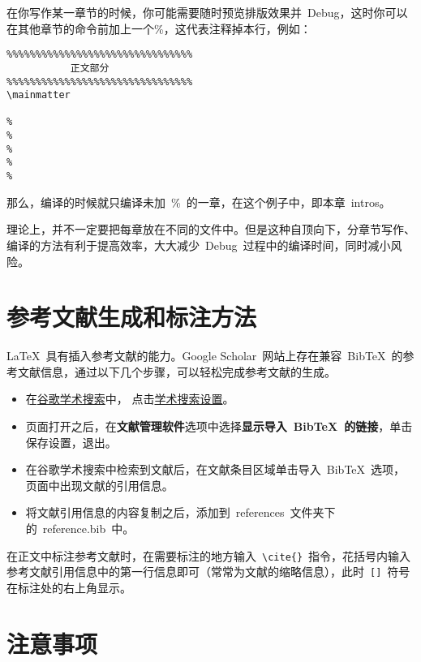 在你写作某一章节的时候，你可能需要随时预览排版效果并~Debug，这时你可以在其他章节的\verb||命令前加上一个\%，这代表注释掉本行，例如：
\begin{verbatim}
%%%%%%%%%%%%%%%%%%%%%%%%%%%%%%%%
           正文部分
%%%%%%%%%%%%%%%%%%%%%%%%%%%%%%%%
\mainmatter

%
%
%
%
%
\end{verbatim}
那么，编译的时候就只编译未加~\%~的一章，在这个例子中，即本章~intros。

理论上，并不一定要把每章放在不同的文件中。但是这种自顶向下，分章节写作、编译的方法有利于提高效率，大大减少~Debug~过程中的编译时间，同时减小风险。

\section{参考文献生成和标注方法}

\LaTeX~具有插入参考文献的能力。Google Scholar~网站上存在兼容~BibTeX~的参考文献信息，通过以下几个步骤，可以轻松完成参考文献的生成。
\begin{itemize}
  \item 在\href{http://scholar.google.com/}{谷歌学术搜索}中，
        点击\href{http://scholar.google.com/scholar_preferences?hl=en&as_sdt=0,5}{学术搜索设置}。
  \item 页面打开之后，在\textbf{文献管理软件}选项中选择\textbf{显示导入~BibTeX~的链接}，单击保存设置，退出。
  \item 在谷歌学术搜索中检索到文献后，在文献条目区域单击导入~BibTeX~选项，页面中出现文献的引用信息。
  \item 将文献引用信息的内容复制之后，添加到~references~文件夹下的~reference.bib~中。
\end{itemize}

在正文中标注参考文献时，在需要标注的地方输入~\verb|\cite{}|~指令，花括号内输入参考文献引用信息中的第一行信息即可（常常为文献的缩略信息），此时~\verb|[]|~符号在标注处的右上角显示。

\section{注意事项}

